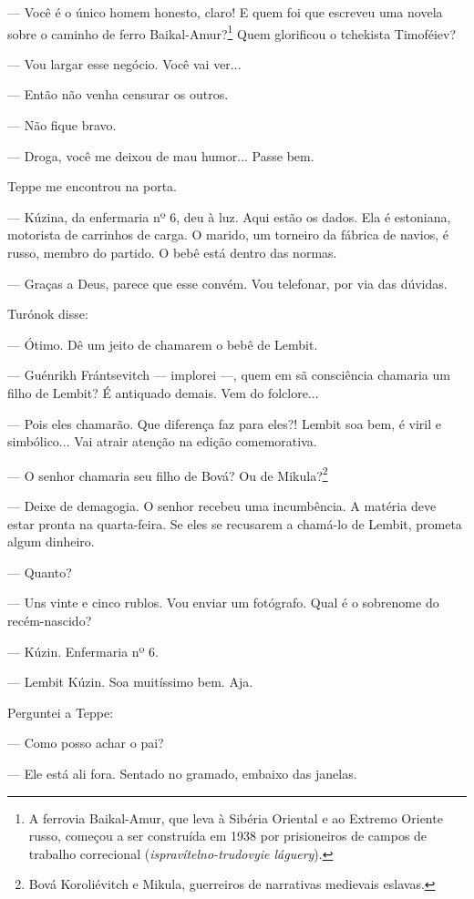 --- Você é o único homem honesto, claro! E quem foi que escreveu uma
novela sobre o caminho de ferro Baikal-Amur?\footnote{A ferrovia
  Baikal-Amur, que leva à Sibéria Oriental e ao Extremo Oriente russo,
  começou a ser construída em 1938 por prisioneiros de campos de
  trabalho correcional (\emph{ispravítelno-trudovyie láguery}).} Quem
glorificou o tchekista Timoféiev?

--- Vou largar esse negócio. Você vai ver...

--- Então não venha censurar os outros.

--- Não fique bravo.

--- Droga, você me deixou de mau humor... Passe bem.

Teppe me encontrou na porta.

--- Kúzina, da enfermaria nº 6, deu à luz. Aqui estão os dados. Ela é
estoniana, motorista de carrinhos de carga. O marido, um torneiro da
fábrica de navios, é russo, membro do partido. O bebê está dentro das
normas.

--- Graças a Deus, parece que esse convém. Vou telefonar, por via das
dúvidas.

Turónok disse:

--- Ótimo. Dê um jeito de chamarem o bebê de Lembit.

--- Guénrikh Frántsevitch --- implorei ---, quem em sã consciência
chamaria um filho de Lembit? É antiquado demais. Vem do folclore...

--- Pois eles chamarão. Que diferença faz para eles?! Lembit soa bem, é
viril e simbólico... Vai atrair atenção na edição comemorativa.

--- O senhor chamaria seu filho de Bová? Ou de Mikula?\footnote{Bová
  Koroliévitch e Mikula, guerreiros de narrativas medievais eslavas.}

--- Deixe de demagogia. O senhor recebeu uma incumbência. A matéria deve
estar pronta na quarta-feira. Se eles se recusarem a chamá-lo de Lembit,
prometa algum dinheiro.

--- Quanto?

--- Uns vinte e cinco rublos. Vou enviar um fotógrafo. Qual é o
sobrenome do recém-nascido?

--- Kúzin. Enfermaria nº 6.

--- Lembit Kúzin. Soa muitíssimo bem. Aja.

Perguntei a Teppe:

--- Como posso achar o pai?

--- Ele está ali fora. Sentado no gramado, embaixo das janelas.


